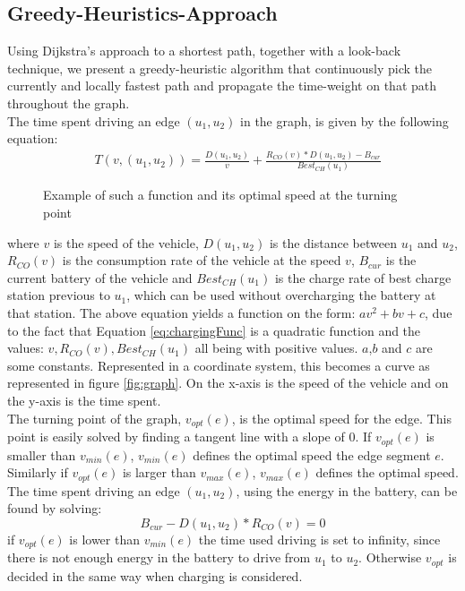 \subsection{Greedy-Heuristics-Approach}
Using Dijkstra's approach to a shortest path, together with a look-back technique, we present a greedy-heuristic algorithm that continuously pick the currently and locally fastest path and propagate the time-weight on that path throughout the graph.\\
The time spent driving an edge $(u_1, u_2)$ in the graph, is given by the following equation:
\begin{equation}
\begin{aligned}
 & T(v,(u_1, u_2)) = \frac{D(u_1, u_2)}{v} + \frac{R_{CO}(v) * D(u_1, u_2) - B_{cur}}{Best_{CH}(u_1)}
\end{aligned}
\end{equation}\label{eq:drivingAndCharging}

\begin{figure}[!htb]
\caption{Example of such a function and its optimal speed at the turning point}
\end{figure}\label{fig:graph}
where $v$ is the speed of the vehicle, $D(u_1, u_2)$ is the distance between $u_1$ and $u_2$,
$R_{CO}(v)$ is the consumption rate of the vehicle at the speed $v$, $B_{cur}$ is the current battery of the vehicle and $Best_{CH}(u_1)$ is the charge rate of best charge station previous to $u_1$, which can be used without overcharging the battery at that station. The above equation yields a function on the form: $av^2 + bv + c$, due to the fact that Equation \ref{eq:chargingFunc} is a quadratic function and the values: $v, R_{CO}(v), Best_{CH}(u_1)$ all being with positive values. $a$,$b$ and $c$ are some constants. Represented in a coordinate system, this becomes a curve as represented in figure \ref{fig:graph}. On the x-axis is the speed of the vehicle and on the y-axis is the time spent.\\
The turning point of the graph, $v_{opt}(e)$, is the optimal speed for the edge. This point is easily solved by finding a tangent line with a slope of 0. If $v_{opt}(e)$ is smaller than $v_{min}(e)$, $v_{min}(e)$ defines the optimal speed the edge segment $e$. Similarly if $v_{opt}(e)$ is larger than $v_{max}(e)$, $v_{max}(e)$ defines the optimal speed.  \\
The time spent driving an edge $(u_1, u_2)$, using the energy in the battery, can be found by solving:
\[B_{cur} - D(u_1, u_2) * R_{CO}(v) = 0\] 
if $v_{opt}(e)$ is lower than $v_{min}(e)$ the time used driving is set to infinity, since there is not enough energy in the battery to drive from $u_1$ to $u_2$. Otherwise $v_{opt}$ is decided in the same way when charging is considered.\\

